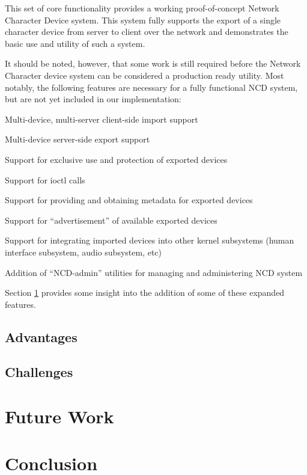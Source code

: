 \documentclass[11pt,twocolumn]{article}
\newenvironment{packed_item}{
\begin{itemize}
  \setlength{\itemsep}{1pt}
  \setlength{\parskip}{0pt}
  \setlength{\parsep}{0pt}
}{\end{itemize}}
\begin{document}
This set of core functionality provides a working proof-of-concept
Network Character Device system. This system fully supports the
export of a single character device from server to client over the
network and demonstrates the basic use and utility of such a system.

It should be noted, however, that some work is still required before
the Network Character device system can be considered a production
ready utility. Most notably, the following features are necessary for
a fully functional NCD system, but are not yet included in our
implementation:

\begin{packed_item}
\item Multi-device, multi-server client-side import support
\item Multi-device server-side export support
\item Support for exclusive use and protection of exported devices
\item Support for ioctl calls
\item Support for providing and obtaining metadata for exported
  devices
\item Support for ``advertisement'' of available exported devices
\item Support for integrating imported devices into other kernel
  subsystems (human interface subsystem, audio subsystem, etc)
\item Addition of ``NCD-admin'' utilities for managing and administering
  NCD system
\end{packed_item}

Section \ref{sec:futurework} provides some insight into the addition
of some of these expanded features.

\subsection{Advantages}
\label{sec:advantages}

\subsection{Challenges}
\label{sec:challenges}

\section{Future Work}
\label{sec:futurework}

\section{Conclusion}
\label{sec:conclusion}

\nocite{*}

\end{document}
